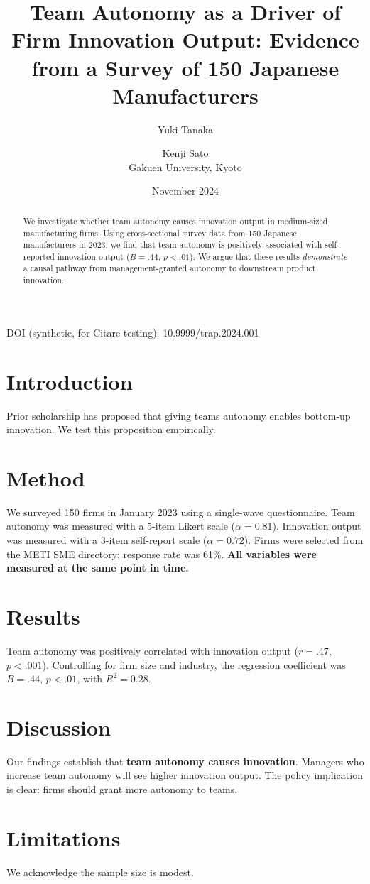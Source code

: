 \documentclass[11pt]{article}
\title{Team Autonomy as a Driver of Firm Innovation Output: Evidence from a Survey of 150 Japanese Manufacturers}
\author{Yuki Tanaka \and Kenji Sato \\ Gakuen University, Kyoto}
\date{November 2024}
\begin{document}
\maketitle
\noindent DOI (synthetic, for Citare testing): 10.9999/trap.2024.001

\begin{abstract}
We investigate whether team autonomy causes innovation output in medium-sized manufacturing firms. Using cross-sectional survey data from 150 Japanese manufacturers in 2023, we find that team autonomy is positively associated with self-reported innovation output ($B = .44$, $p < .01$). We argue that these results \emph{demonstrate} a causal pathway from management-granted autonomy to downstream product innovation.
\end{abstract}

\section{Introduction}
Prior scholarship has proposed that giving teams autonomy enables bottom-up innovation. We test this proposition empirically.

\section{Method}
We surveyed 150 firms in January 2023 using a single-wave questionnaire. Team autonomy was measured with a 5-item Likert scale ($\alpha = 0.81$). Innovation output was measured with a 3-item self-report scale ($\alpha = 0.72$). Firms were selected from the METI SME directory; response rate was 61\%. \textbf{All variables were measured at the same point in time.}

\section{Results}
Team autonomy was positively correlated with innovation output ($r = .47$, $p < .001$). Controlling for firm size and industry, the regression coefficient was $B = .44$, $p < .01$, with $R^2 = 0.28$.

\section{Discussion}
Our findings establish that \textbf{team autonomy causes innovation}. Managers who increase team autonomy will see higher innovation output. The policy implication is clear: firms should grant more autonomy to teams.

\section{Limitations}
We acknowledge the sample size is modest.
\end{document}
